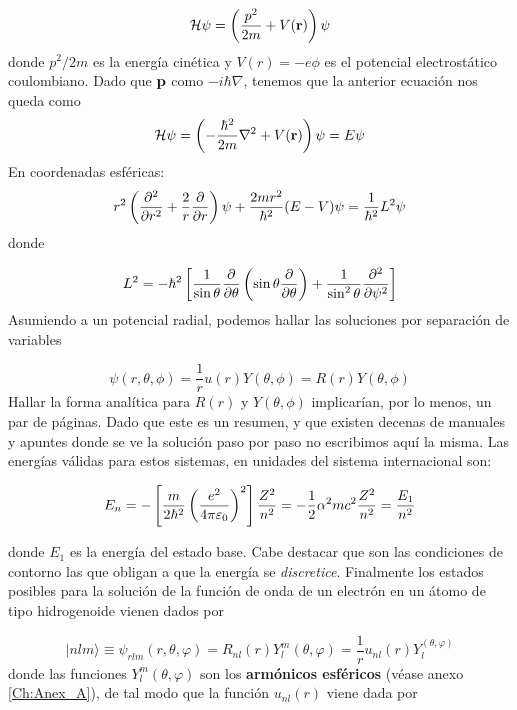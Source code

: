 \begin{equation}
    \mathcal{H} \psi =\left( \frac{p^2}{2m} + V(\mathbf{r}) \right) \psi 
\end{equation}
donde $p^2/2m$ es la energía cinética y $V(r)=-e\phi$ es el potencial electrostático coulombiano. Dado que $\mathbf{p} $ como $-i\hbar \nabla$, tenemos que la anterior ecuación nos queda como
\begin{equation}
    \mathcal{H} \psi = \left( - \frac{\hbar^2}{2m} \nabla^2 + V(\mathbf{r}) \right) \psi = E \psi
\end{equation}
En coordenadas esféricas:
\begin{equation}
    r^2 \left( \frac{\partial ^2}{\partial r^2} + \frac{2}{r} \frac{\partial }{\partial r} \right) \psi + \frac{2mr^2}{\hbar^2} (E-V) \psi = \frac{1}{\hbar^2} L^2 \psi
\end{equation}
donde 

\begin{equation}
    L^2 = - \hbar^2 \left[ \frac{1}{\sin \theta} \frac{\partial }{\partial \theta} \left( \sin  \theta \frac{\partial }{\partial \theta} \right) + \frac{1}{\sin^2 \theta} \frac{\partial ^2}{\partial \psi^2} \right]
\end{equation}
Asumiendo a un potencial radial, podemos hallar las soluciones por separación de variables

\begin{equation}
    \psi (r,\theta,\phi) =  \frac{1}{r} u(r) Y(\theta,\phi) = R(r) Y(\theta, \phi)
\end{equation}
Hallar la forma analítica para $R(r)$ y $Y(\theta,\phi)$ implicarían, por lo menos, un par de páginas. Dado que este es un resumen, y que existen decenas de manuales y apuntes donde se ve la solución paso por paso no escribimos aquí la misma. Las energías válidas para estos sistemas, en unidades del sistema internacional son: 
\begin{Anotacion}
\begin{equation}
    E_n = - \left[ \frac{m}{2\hbar^2} \left( \frac{e^2}{4 \pi \varepsilon_0} \right)^2 \right] \frac{Z^2}{n^2} = - \frac{1}{2} \alpha^2 m c^2 \frac{Z^2}{n^2 } = \frac{E_1}{n^2}
\end{equation}
\end{Anotacion}
donde $E_1$ es la energía del estado base. Cabe destacar que son las condiciones de contorno las que obligan a que la energía se \textit{discretice}. Finalmente los estados posibles para la solución de la función de onda de un electrón en un átomo de tipo hidrogenoide vienen dados por

\begin{equation}
|n l m \rangle \equiv \psi_{rlm} (r,\theta,\varphi) = R_{nl} (r) Y_l^m (\theta,\varphi) = \frac{1}{r} u_{nl} (r) Y_l^ (\theta,\varphi)
\end{equation}
donde las funciones $Y_l^m (\theta,\varphi)$ son los \textbf{armónicos esféricos} (véase anexo \ref{Ch:Anex_A}), de tal modo que la función $u_{nl} (r)$ viene dada por

